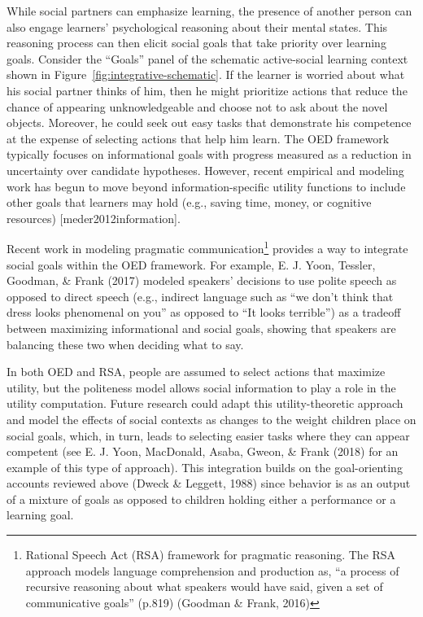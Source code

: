 \documentclass[oneside]{report}
\begin{document}
While social partners can emphasize learning, the presence of another
person can also engage learners' psychological reasoning about their
mental states. This reasoning process can then elicit social goals that
take priority over learning goals. Consider the ``Goals'' panel of the
schematic active-social learning context shown in
Figure~\ref{fig:integrative-schematic}. If the learner is worried about
what his social partner thinks of him, then he might prioritize actions
that reduce the chance of appearing unknowledgeable and choose not to
ask about the novel objects. Moreover, he could seek out easy tasks that
demonstrate his competence at the expense of selecting actions that help
him learn. The OED framework typically focuses on informational goals
with progress measured as a reduction in uncertainty over candidate
hypotheses. However, recent empirical and modeling work has begun to
move beyond information-specific utility functions to include other
goals that learners may hold (e.g., saving time, money, or cognitive
resources) {[}meder2012information{]}.

Recent work in modeling pragmatic communication\footnote{Rational Speech
  Act (RSA) framework for pragmatic reasoning. The RSA approach models
  language comprehension and production as, ``a process of recursive
  reasoning about what speakers would have said, given a set of
  communicative goals'' (p.819) (Goodman \& Frank, 2016)} provides a way
to integrate social goals within the OED framework. For example, E. J.
Yoon, Tessler, Goodman, \& Frank (2017) modeled speakers' decisions to
use polite speech as opposed to direct speech (e.g., indirect language
such as ``we don't think that dress looks phenomenal on you'' as opposed
to ``It looks terrible'') as a tradeoff between maximizing informational
and social goals, showing that speakers are balancing these two when
deciding what to say.

In both OED and RSA, people are assumed to select actions that maximize
utility, but the politeness model allows social information to play a
role in the utility computation. Future research could adapt this
utility-theoretic approach and model the effects of social contexts as
changes to the weight children place on social goals, which, in turn,
leads to selecting easier tasks where they can appear competent (see E.
J. Yoon, MacDonald, Asaba, Gweon, \& Frank (2018) for an example of this
type of approach). This integration builds on the goal-orienting
accounts reviewed above (Dweck \& Leggett, 1988) since behavior is as an
output of a mixture of goals as opposed to children holding either a
performance or a learning goal.
\end{document}
